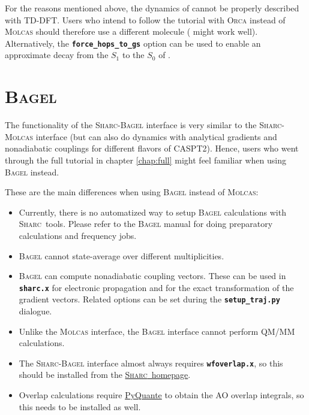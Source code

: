 \documentclass[a4paper,11pt,DIV=15,openany]{scrbook}
\makeatletter
\newcommand{\link}[2]{\href{#1}{#2}}
\newcommand{\refermanual}[2][rectangle,draw=B,thick,fill=black!5,inner sep=1pt,outer sep=0pt,rounded corners]{\marginpar{\tikz[baseline=(current bounding box.north)]\node at (0,0) [#1]{\begin{tabular}{@{}l@{}}See\\ section\\ \ref*{#2}\\ (p. \pageref*{#2})\\ in the\\ manual.\end{tabular}};}}
\newcommand{\sharc}{\textsc{Sharc}}
\newcommand{\ttt}[1]{\textbf{\texttt{#1}}}
\makeatother
\begin{document}
For the reasons mentioned above, the dynamics of  cannot be properly described with TD-DFT.
Users who intend to follow the tutorial with \textsc{Orca} instead of \textsc{Molcas} should therefore use a different molecule ( might work well).
Alternatively, the \ttt{force\_hops\_to\_gs} option can be used to enable an approximate decay from the $S_1$ to the $S_0$ of  .


\section{\textsc{Bagel}}
\refermanual{m-sec:int:bagel}


The functionality of the \sharc-\textsc{Bagel} interface is very similar to the \sharc-\textsc{Molcas} interface (but can also do dynamics with analytical gradients and nonadiabatic couplings for different flavors of CASPT2).
Hence, users who went through the full tutorial in chapter \ref{chap:full} might feel familiar when using \textsc{Bagel} instead.

These are the main differences when using \textsc{Bagel} instead of \textsc{Molcas}:
\begin{itemize}
  \item Currently, there is no automatized way to setup \textsc{Bagel} calculations with \sharc\ tools. Please refer to the \textsc{Bagel} manual for doing preparatory calculations and frequency jobs.
  \item \textsc{Bagel} cannot state-average over different multiplicities. 
  \item \textsc{Bagel} can compute nonadiabatic coupling vectors. These can be used in \ttt{sharc.x} for electronic propagation and for the exact transformation of the gradient vectors. Related options can be set during the \ttt{setup\_traj.py} dialogue.
  \item Unlike the \textsc{Molcas} interface, the \textsc{Bagel} interface cannot perform QM/MM calculations.
  \item The \sharc-\textsc{Bagel} interface almost always requires \ttt{wfoverlap.x}, so this should be installed from the \link{https://sharc-md.org/?page_id=309}{\sharc\ homepage}.
  \item Overlap calculations require \link{http://pyquante.sourceforge.net/}{PyQuante} to obtain the AO overlap integrals, so this needs to be installed as well.
\end{itemize}
\end{document}
